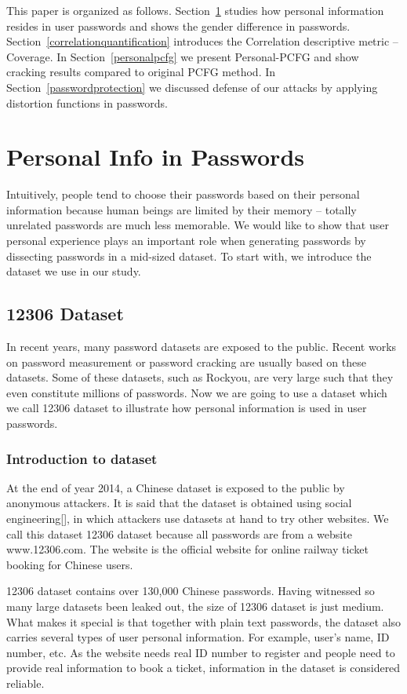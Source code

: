 \documentclass{sig-alternate}
\begin{document}
This paper is organized as follows. Section~\ref{personalinfo} studies how personal information resides in user passwords and shows the gender difference in passwords. Section~\ref{correlationquantification} introduces the Correlation descriptive metric -- Coverage. In Section~\ref{personalpcfg} we present Personal-PCFG and show cracking results compared to original PCFG method. In Section~\ref{passwordprotection} we discussed defense of our attacks by applying distortion functions in passwords.

\section{Personal Info in Passwords}
\label{personalinfo}
Intuitively, people tend to choose their passwords based on their personal information because human beings are limited by their memory -- totally unrelated passwords are much less memorable. We would like to show that user personal experience plays an important role when generating passwords by dissecting passwords in a mid-sized dataset. To start with, we introduce the dataset we use in our study. 

\subsection{12306 Dataset}
In recent years, many password datasets are exposed to the public. Recent works on password measurement or password cracking are usually based on these datasets. Some of these datasets, such as Rockyou, are very large such that they even constitute millions of passwords. Now we are going to use a dataset which we call 12306 dataset to illustrate how personal information is used in user passwords.
\subsubsection{Introduction to dataset}
At the end of year 2014, a Chinese dataset is exposed to the public by anonymous attackers. It is said that the dataset is obtained using social engineering[], in which attackers use datasets at hand to try other websites. We call this dataset 12306 dataset because all passwords are from a website www.12306.com. The website is the official website for online railway ticket booking for Chinese users.

12306 dataset contains over 130,000 Chinese passwords. Having witnessed so many large datasets been leaked out, the size of 12306 dataset is just medium. What makes it special is that together with plain text passwords, the dataset also carries several types of user personal information. For example, user's name, ID number, etc. As the website needs real ID number to register and people need to provide real information to book a ticket, information in the dataset is considered reliable.
\end{document}
